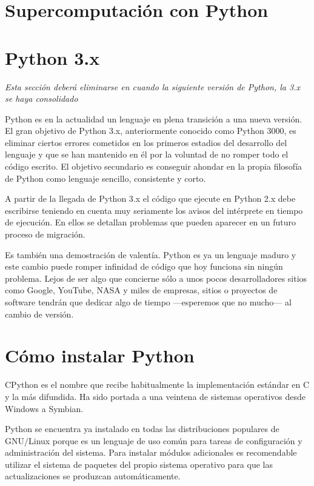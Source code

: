 \documentclass[a4paper,10pt]{article}
\begin{document}
\section{Supercomputación con Python}

\appendix

\section{Python 3.x}

\emph{Esta sección deberá eliminarse en cuando la siguiente versión de
Python, la 3.x se haya consolidado}

Python es en la actualidad un lenguaje en plena transición a una nueva
versión.  El gran objetivo de Python 3.x, anteriormente conocido como
Python 3000, es eliminar ciertos errores cometidos en los primeros
estadios del desarrollo del lenguaje y que se han mantenido en él por
la voluntad de no romper todo el código escrito. El objetivo
secundario es conseguir ahondar en la propia filosofía de Python como
lenguaje sencillo, consistente y corto.

A partir de la llegada de Python 3.x el código que ejecute en Python
2.x debe escribirse teniendo en cuenta muy seriamente los avisos del
intérprete en tiempo de ejecución.  En ellos se detallan problemas que
pueden aparecer en un futuro proceso de migración.

Es también una demostración de valentía.  Python es ya un lenguaje
maduro y este cambio puede romper infinidad de código que hoy funciona
sin ningún problema.  Lejos de ser algo que concierne sólo a unos
pocos desarrolladores sitios como Google, YouTube, NASA y miles de
empresas, sitios o proyectos de software tendrán que dedicar algo de
tiempo ---esperemos que no mucho--- al cambio de versión.

\section{Cómo instalar Python}
\label{sec:instalar}

CPython es el nombre que recibe habitualmente la implementación
estándar en C y la más difundida. Ha sido portada a una veintena de
sistemas operativos desde Windows a Symbian.

Python se encuentra ya instalado en todas las distribuciones populares
de GNU/Linux porque es un lenguaje de uso común para tareas de
configuración y administración del sistema.  Para instalar módulos
adicionales es recomendable utilizar el sistema de paquetes del propio
sistema operativo para que las actualizaciones se produzcan
automáticamente.
\end{document}

